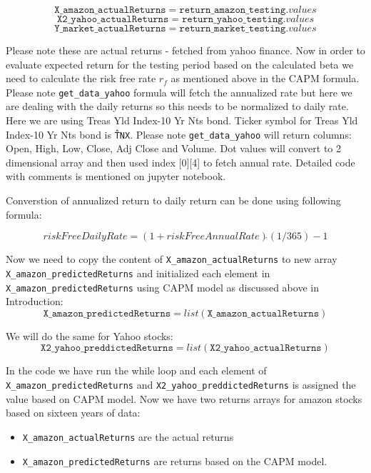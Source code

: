 \indent

$$\texttt{X\_amazon\_actualReturns} = \texttt{return\_amazon\_testing}.values$$
$$\texttt{X2\_yahoo\_actualReturns} = \texttt{return\_yahoo\_testing}.values$$
$$\texttt{Y\_market\_actualReturns} = \texttt{return\_market\_testing}.values$$

\indent

Please note these are actual returns - fetched from yahoo finance. Now in order to evaluate expected return for the testing period based on the calculated beta we need 
to calculate the risk free rate $r_{f}$ as mentioned above in the CAPM formula. Please note \texttt{get\_data\_yahoo} formula will fetch the annualized rate but here we are dealing 
with the daily returns so this needs to be normalized to daily rate. Here we are using Treas Yld Index-10 Yr Nts bond. Ticker symbol for Treas Yld Index-10 Yr Nts bond
is \texttt{\^TNX}. Please note \texttt{get\_data\_yahoo} will return columns: Open, High, Low, Close, Adj Close and Volume. Dot values will convert to 2 dimensional array 
and then used index [0][4] to fetch annual rate. Detailed code with comments is mentioned on jupyter notebook. 

Converstion of annualized return to daily return can be done using following formula:

\indent
$$riskFreeDailyRate = (1+riskFreeAnnualRate) \hat{} (1/365) -1 $$
\indent 

Now we need to copy the content of \texttt{X\_amazon\_actualReturns} to new array \texttt{X\_amazon\_predictedReturns} and initialized each element in \texttt{X\_amazon\_predictedReturns} using 
CAPM model as discussed above in Introduction:
\indent
$$\texttt{X\_amazon\_predictedReturns} = list(\texttt{X\_amazon\_actualReturns})$$

\indent 
We will do the same for Yahoo stocks:
\indent 
$$\texttt{X2\_yahoo\_preddictedReturns} = list(\texttt{X2\_yahoo\_actualReturns})$$
\indent 


In the code we have run the while loop and each element of \texttt{X\_amazon\_predictedReturns} and \texttt{X2\_yahoo\_preddictedReturns} is assigned the value
based on CAPM model. Now we have two returns arrays for amazon stocks based on sixteen years of data: 

\begin{itemize} 
\item \texttt{X\_amazon\_actualReturns} are the actual returns  
\item \texttt{X\_amazon\_predictedReturns} are returns based on the CAPM model. 
\end{itemize}

